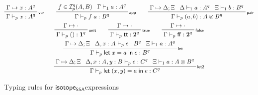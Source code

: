 \documentclass[acmsmall,screen,review]{acmart}
\newcommand{\mc}[1]{\ensuremath{\mathcal{#1}}}
\newcommand{\mb}[1]{\ensuremath{\mathbf{#1}}}
\newcommand{\ms}[1]{\ensuremath{\mathsf{#1}}}
\newcommand{\lbl}[1]{{`#1}}
\newcommand{\ctt}{\ms{tt}}
\newcommand{\cff}{\ms{ff}}
\newcommand{\letexpr}[3]{\ensuremath{\ms{let}\;#1 = #2\;\ms{in}\;#3}}
\newcommand{\csplits}[3]{#1 \mapsto #2;#3}
\newcommand{\cwk}[2]{#1 \mapsto #2}
\newcommand{\thyp}[3]{#1: {#2}^{#3}}
\newcommand{\lhyp}[3]{#1[#2](#3)}
\newcommand{\llhyp}[3]{\lhyp{\lbl{#1}}{#2}{#3}}
\newcommand{\rle}[1]{{\scriptsize\textsf{#1}}}
\newcommand{\hasty}[5]{#1 \vdash_{#2} #3: {#4}^{#5}}
\newcommand{\haslb}[3]{#1 \vdash #2 \rhd #3}
\newcommand{\isotopessa}{\ms{isotope_{SSA}}}
\begin{document}
\begin{figure}
  \begin{gather*}    
    \prftree[r]{\rle{var}}
      {\cwk{\Gamma}{\thyp{x}{A}{q}}}
      {\hasty{\Gamma}{p}{x}{A}{q}} \qquad
    \prftree[r]{\rle{app}}
      {f \in \mc{I}_p^q(A, B)}
      {\hasty{\Gamma}{1}{a}{A}{q}}
      {\hasty{\Gamma}{p}{f\;a}{B}{q}} \qquad
    \prftree[r]{\rle{pair}}
      {\csplits{\Gamma}{\Delta}{\Xi}}
      {\hasty{\Delta}{1}{a}{A}{q}}
      {\hasty{\Xi}{1}{b}{B}{q}}
      {\hasty{\Gamma}{p}{(a, b)}{A \otimes B}{q}} \\
    \prftree[r]{\rle{unit}}
      {\cwk{\Gamma}{\cdot}}
      {\hasty{\Gamma}{p}{()}{\mb{1}}{q}} \qquad
    \prftree[r]{\rle{true}}
      {\cwk{\Gamma}{\cdot}}
      {\hasty{\Gamma}{p}{\ctt}{\mb{2}}{q}} \qquad
    \prftree[r]{\rle{false}}
      {\cwk{\Gamma}{\cdot}}
      {\hasty{\Gamma}{p}{\cff}{\mb{2}}{q}} \\
    \prftree[r]{\rle{let}}
      {\csplits{\Gamma}{\Delta}{\Xi}}
      {\hasty{\Delta, \thyp{x}{A}{}}{p}{e}{B}{q}}
      {\hasty{\Xi}{1}{a}{A}{q}}
      {\hasty{\Gamma}{p}{\letexpr{x}{a}{e}}{B}{q}} \qquad
      \\
    \prftree[r]{\rle{let2}}
      {\csplits{\Gamma}{\Delta}{\Xi}}
      {\hasty{\Delta, \thyp{x}{A}{}, \thyp{y}{B}{}}{p}{e}{C}{q}}
      {\hasty{\Xi}{1}{a}{A \otimes B}{q}}
      {\hasty{\Gamma}{p}{\letexpr{(x, y)}{a}{e}}{C}{q}}
  \end{gather*}
  \caption{Typing rules for \isotopessa expressions}
  \label{fig:ssa-term-typing}
\end{figure}
\end{document}
